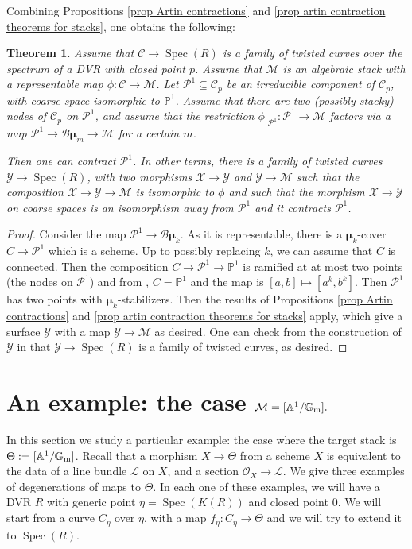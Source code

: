 \documentclass{amsart}
\newcommand{\bA}{\mathbb{A}}
\newcommand{\bG}{\mathbb{G}}
\newcommand{\bP}{\mathbb{P}}
\newcommand{\cB}{\mathcal{B}}
\newcommand{\cC}{\mathcal{C}}
\newcommand{\cL}{\mathcal{L}}
\newcommand{\cM}{\mathcal{M}}
\newcommand{\cO}{\mathcal{O}}
\newcommand{\cP}{\mathcal{P}}
\newcommand{\cX}{\mathcal{X}}
\newcommand{\cY}{\mathcal{Y}}
\newcommand{\spec}{\operatorname{Spec}}
\newcommand{\Gm}{\bG_{{\rm m}}}
\newcommand{\bmu}{\bm{\mu}}
\newtheorem{Teo}[theorem]{Theorem}
\theoremstyle{definition}
\begin{document}
Combining Propositions \ref{prop Artin contractions} and \ref{prop artin contraction theorems for stacks}, one obtains the following:
\begin{Teo}\label{theorem contracting stacky P1s}
Assume that $\cC\to \spec(R)$ is a family of twisted curves over the spectrum of a DVR with closed point $p$. Assume that $\cM$ is an algebraic stack with a representable map $\phi:\cC\to \cM$. Let $\cP^1\subseteq \cC_p$ be an irreducible component of $\cC_p$, with coarse space isomorphic to $\bP^1$. Assume that there are two (possibly stacky) nodes of $\cC_p$ on $\cP^1$, and assume that the restriction $\phi|_{\cP^1}:\cP^1\to \cM$ factors via a map $\cP^1\to \cB\bmu_m\to\cM$ for a certain $m$.

Then one can contract $\cP^1$. In other terms, there is a family of twisted curves  $\cY\to \spec(R)$, with two morphisms $\cX\to \cY$ and $\cY\to \cM$ such that the composition $\cX\to \cY\to \cM$ is isomorphic to $\phi$ and such that the morphism $\cX\to \cY$ on coarse spaces is an isomorphism away from $\cP^1$ and it contracts $\cP^1$.
\end{Teo}
\begin{proof}
Consider the map $\cP^1\to \cB\bmu_k$. As it is representable, there is a $\bmu_k$-cover $C\to \cP^1$ which is a scheme. Up to possibly replacing $k$, we can assume that $C$ is connected. Then the composition $C\to \cP^1\to \bP^1$ is ramified at at most two points (the nodes on $\cP^1$) and from , $C=\bP^1$ and the map is $[a,b]\mapsto [a^k,b^k]$. Then $\cP^1$ has two points with $\bmu_k$-stabilizers. Then the results of Propositions \ref{prop Artin contractions} and \ref{prop artin contraction theorems for stacks} apply, which give a surface $\cY $ with a map $\cY\to \cM$ as desired. One can check from the construction of $\cY$ in  that $\cY\to \spec(R)$ is a family of twisted curves, as desired.\end{proof}
\section{An example: the case $\cM=[\bA^1/\Gm].$}\label{section example}

In this section we study a particular example: the case where the target stack is $\Theta:=[\bA^1/\Gm]$. Recall that a morphism $X\to \Theta$ from a scheme $X$ is equivalent to the data of a line bundle $\cL$ on $X$, and a section $\cO_X\to \cL$. We give three examples of degenerations of maps to $\Theta$. In each one of these examples, we will have a DVR $R$ with generic point $\eta = \spec(K(R))$ and closed point $0$. We will start from a curve $C_\eta$ over $\eta$, with a map $f_\eta:C_\eta \to \Theta$ and we will try to extend it to $\spec(R)$.
\end{document}

